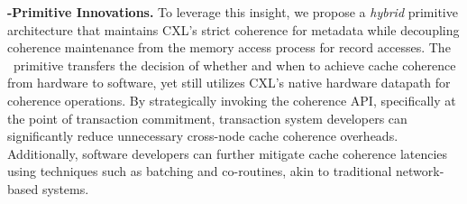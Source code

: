 \noindent \textbf{\name-Primitive Innovations.}
To leverage this insight, we propose a \textit{hybrid} primitive architecture that maintains CXL’s strict coherence for metadata while decoupling coherence maintenance from the memory access process for record accesses. The \name~primitive transfers the decision of whether and when to achieve cache coherence from hardware to software, yet still utilizes CXL’s native hardware datapath for coherence operations. By strategically invoking the coherence API, specifically at the point of transaction commitment, transaction system developers can significantly reduce unnecessary cross-node cache coherence overheads. Additionally, software developers can further mitigate cache coherence latencies using techniques such as batching and co-routines, akin to traditional network-based systems.











